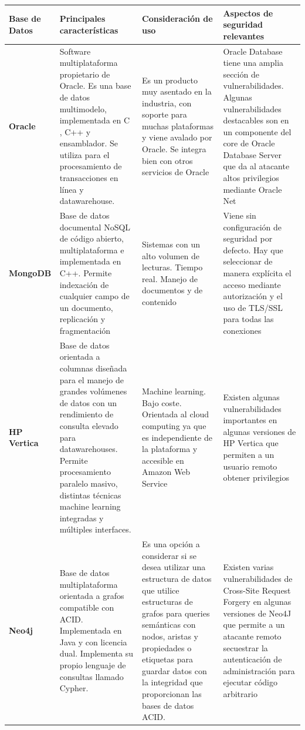 \documentclass[10pt,a4paper]{article}
\begin{document}
\begin{tabularx}{\textwidth}{|X|X|X|X|}

\hline
\textbf{Base de Datos} & \textbf{Principales características} & \textbf{Consideración de uso} & \textbf{Aspectos de seguridad relevantes} \\ \hline
\textbf{Oracle} & Software multiplataforma propietario de Oracle. Es una base de datos multimodelo, implementada en C , C++ y ensamblador. Se utiliza para el procesamiento de transacciones en línea y datawarehouse. & Es un producto muy asentado en la industria, con soporte para muchas plataformas y viene avalado por Oracle. Se integra bien con otros servicios de Oracle & Oracle Database tiene una amplia sección de vulnerabilidades. Algunas vulnerabilidades destacables son en un componente del core de Oracle Database Server que da al atacante altos privilegios mediante Oracle Net \cite{oraclesec}\\ \hline

\textbf{MongoDB} & Base de datos documental NoSQL de código abierto, multiplataforma e implementada en C++. Permite indexación de cualquier campo de un documento, replicación y fragmentación & Sistemas con un alto volumen de lecturas. Tiempo real. Manejo de documentos y de contenido & Viene sin configuración de seguridad por defecto. Hay que seleccionar de manera explícita el acceso mediante autorización y el uso de TLS/SSL para todas las conexiones \\ \hline

\textbf{HP Vertica} & Base de datos orientada a columnas diseñada para el manejo de grandes volúmenes de datos con un rendimiento de consulta elevado para datawarehouses. Permite procesamiento paralelo masivo, distintas técnicas machine learning integradas y múltiples interfaces. & Machine learning. Bajo coste. Orientada al cloud computing ya que es independiente de la plataforma y accesible en Amazon Web Service & Existen algunas vulnerabilidades importantes en algunas versiones de HP Vertica que permiten a un usuario remoto obtener privilegios \cite{hpvertsec}\\ \hline

\textbf{Neo4j} & Base de datos multiplataforma orientada a grafos compatible con ACID. Implementada en Java y con licencia dual. Implementa su propio lenguaje de consultas llamado Cypher. & Es una opción a considerar si se desea utilizar una estructura de datos que utilice estructuras de grafos para queries semánticas con nodos, aristas y propiedades o etiquetas para guardar datos con la integridad que proporcionan las bases de datos ACID. &
Existen varias vulnerabilidades de Cross-Site Request Forgery en algunas versiones de Neo4J que permite a un atacante remoto secuestrar la autenticación de administración para ejecutar código arbitrario \cite{neo4jsec}\\ \hline


\end{tabularx}
\end{document}
